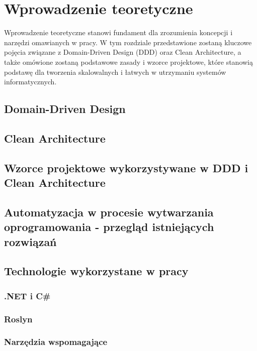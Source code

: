 \newpage
\section{Wprowadzenie teoretyczne}
Wprowadzenie teoretyczne stanowi fundament dla zrozumienia koncepcji i narzędzi omawianych w pracy. W tym rozdziale przedstawione zostaną kluczowe pojęcia związane z Domain-Driven Design (DDD) oraz Clean Architecture, a także omówione zostaną podstawowe zasady i wzorce projektowe, które stanowią podstawę dla tworzenia skalowalnych i łatwych w utrzymaniu systemów informatycznych.

\subsection{Domain-Driven Design}

\subsection{Clean Architecture}

\subsection{Wzorce projektowe wykorzystywane w DDD i Clean Architecture}

\subsection{Automatyzacja w procesie wytwarzania oprogramowania - przegląd istniejących rozwiązań}

\subsection{Technologie wykorzystane w pracy}

\subsubsection{.NET i C\#}

\subsubsection{Roslyn}

\subsubsection{Narzędzia wspomagające}